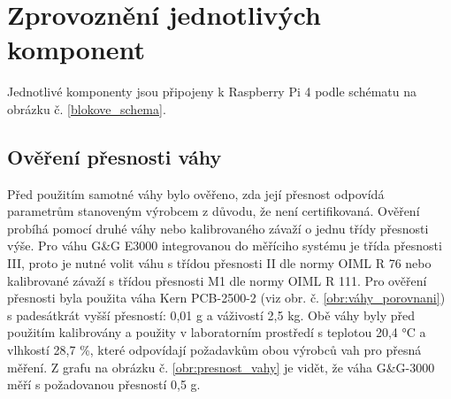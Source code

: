 \chapter{Zprovoznění jednotlivých komponent}
\label{Zprovoznění jednotlivých komponent}
Jednotlivé komponenty jsou připojeny k Raspberry Pi 4 podle schématu na obrázku č. \ref{blokove_schema}. %

\section{Ověření přesnosti váhy}

Před použitím samotné váhy bylo ověřeno, zda její přesnost odpovídá parametrům stanoveným výrobcem z důvodu, že není certifikovaná. Ověření probíhá pomocí druhé váhy nebo kalibrovaného závaží o jednu třídy přesnosti výše. Pro váhu G\&G E3000 integrovanou do měříciho systému je třída přesnosti III, proto je nutné volit váhu s třídou přesnosti II dle normy OIML R 76 nebo kalibrované závaží s třídou přesnosti M1 dle normy OIML R 111. Pro ověření přesnosti byla použita váha Kern PCB-2500-2 (viz obr. č. \ref{obr:váhy_porovnani}) s padesátkrát vyšší přesností: 0,01 g a váživostí 2,5 kg. Obě váhy byly před použitím kalibrovány a použity v laboratorním prostředí s teplotou 20,4 °C a vlhkostí 28,7 \%, které odpovídají požadavkům obou výrobců vah pro přesná měření. Z grafu na obrázku č. \ref{obr:presnost_vahy} je vidět, že váha G\&G-3000 měří s požadovanou přesností 0,5 g.





